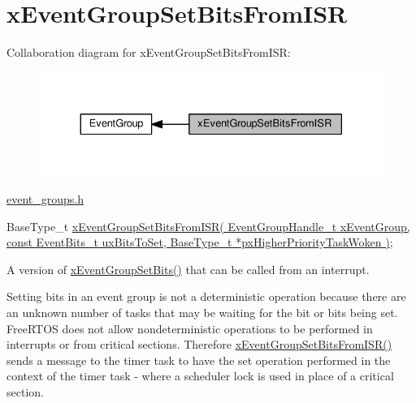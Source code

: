 \hypertarget{group__x_event_group_set_bits_from_i_s_r}{}\section{x\+Event\+Group\+Set\+Bits\+From\+I\+SR}
\label{group__x_event_group_set_bits_from_i_s_r}
Collaboration diagram for x\+Event\+Group\+Set\+Bits\+From\+I\+SR\+:\nopagebreak
\begin{figure}[H]
\begin{center}
\leavevmode
\includegraphics[width=330pt]{group__x_event_group_set_bits_from_i_s_r}
\end{center}
\end{figure}
\hyperlink{event__groups_8h}{event\+\_\+groups.\+h} 
\begin{DoxyPre}
   BaseType\_t \hyperlink{event__groups_8h_a62b68278abac6358369ae8e390988a02}{xEventGroupSetBitsFromISR( EventGroupHandle\_t xEventGroup, const EventBits\_t uxBitsToSet, BaseType\_t *pxHigherPriorityTaskWoken )};
\end{DoxyPre}


A version of \hyperlink{event__groups_8h_a02d7b3bb55f7e11d9c47116266c5fb2e}{x\+Event\+Group\+Set\+Bits()} that can be called from an interrupt.

Setting bits in an event group is not a deterministic operation because there are an unknown number of tasks that may be waiting for the bit or bits being set. Free\+R\+T\+OS does not allow nondeterministic operations to be performed in interrupts or from critical sections. Therefore \hyperlink{event__groups_8h_a62b68278abac6358369ae8e390988a02}{x\+Event\+Group\+Set\+Bits\+From\+I\+S\+R()} sends a message to the timer task to have the set operation performed in the context of the timer task -\/ where a scheduler lock is used in place of a critical section.


